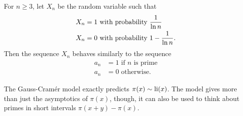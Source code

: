 \begin{mdl}
For $n\ge 3$, let $X_n$ be the random variable such that
\begin{align*}
X_n&=1 \text{ with probability }\frac{1}{\ln n}\\
X_n&=0 \text{ with probability }1-\frac{1}{\ln n}.
\end{align*}
Then the sequence $X_n$ behaves similarly to the sequence 
\begin{align*}
a_n&=1 \text{ if $n$ is prime}\\
a_n&=0 \text{ otherwise.}
\end{align*}
\end{mdl}
The Gauss-Cram\'er model exactly predicts $\pi(x)\sim \operatorname{li}(x)$. The model gives more than just the asymptotics of $\pi(x)$, though, it can also be used to think about primes in short intervals $\pi(x+y)-\pi(x)$. \\

\vskip0.15in

